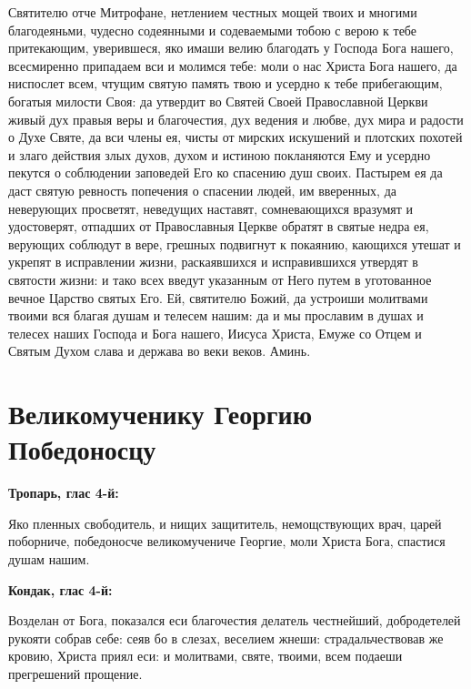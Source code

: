 Святителю отче Митрофане, нетлением честных мощей твоих и многими благодеяньми, чудесно содеянными и содеваемыми тобою с верою к тебе притекающим, уверившеся, яко имаши велию благодать у Господа Бога нашего, всесмиренно припадаем вси и молимся тебе: моли о нас Христа Бога нашего, да ниспослет всем, чтущим святую память твою и усердно к тебе прибегающим, богатыя милости Своя: да утвердит во Святей Своей Православной Церкви живый дух правыя веры и благочестия, дух ведения и любве, дух мира и радости о Духе Святе, да вси члены ея, чисты от мирских искушений и плотских похотей и злаго действия злых духов, духом и истиною покланяются Ему и усердно пекутся о соблюдении заповедей Его ко спасению душ своих. Пастырем ея да даст святую ревность попечения о спасении людей, им вверенных, да неверующих просветят, неведущих наставят, сомневающихся вразумят и удостоверят, отпадших от Православныя Церкве обратят в святые недра ея, верующих соблюдут в вере, грешных подвигнут к покаянию, кающихся утешат и укрепят в исправлении жизни, раскаявшихся и исправившихся утвердят в святости жизни: и тако всех введут указанным от Него путем в уготованное вечное Царство святых Его. Ей, святителю Божий, да устроиши молитвами твоими вся благая душам и телесем нашим: да и мы прославим в душах и телесех наших Господа и Бога нашего, Иисуса Христа, Емуже со Отцем и Святым Духом слава и держава во веки веков. Аминь.

\bigskip\bigskip\mychapterending


 

\section{Великомученику Георгию Победоносцу}
 
\bfseries Тропарь, глас 4-й:\normalfont{}


Яко пленных свободитель, и нищих защититель, немощствующих врач, царей поборниче, победоносче великомучениче Георгие, моли Христа Бога, спастися душам нашим.


\medskip
\bfseries Кондак, глас 4-й:\normalfont{}


Возделан от Бога, показался еси благочестия делатель честнейший, добродетелей рукояти собрав себе: сеяв бо в слезах, веселием жнеши: страдальчествовав же кровию, Христа приял еси: и молитвами, святе, твоими, всем подаеши прегрешений прощение.


